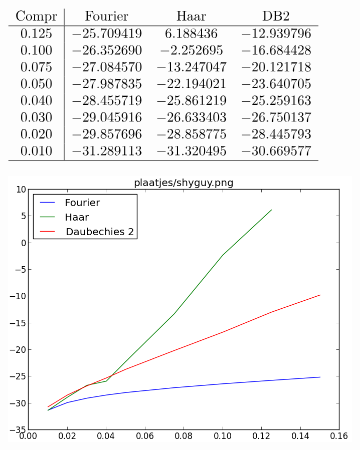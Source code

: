 \begin{figure}
  \centering
  \begin{subfigure}[t]{0.48\textwidth}
    \centering
    \vspace{10pt}
    \begingroup

    \renewcommand*{\arraystretch}{1.5}
    $\begin{array}{c | c c c c}
      \text{Compr} & \text{Fourier} & \text{Haar} & \text{DB2} \\ \hline
      0.125 & -25.709419 & 6.188436 & -12.939796 \\
      0.100 & -26.352690 & -2.252695 & -16.684428 \\
      0.075 & -27.084570 & -13.247047 & -20.121718 \\
      0.050 & -27.987835 & -22.194021 & -23.640705 \\
      0.040 & -28.455719 & -25.861219 & -25.259163 \\
      0.030 & -29.045916 & -26.633403 & -26.750137 \\
      0.020 & -29.857696 & -28.858775 & -28.445793 \\
      0.010 & -31.289113 & -31.320495 & -30.669577 \\ \hline
    \end{array}$
    \endgroup
  \end{subfigure}
  \begin{subfigure}[t]{0.48\textwidth}
    \centering
    \vspace{0pt}
    \includegraphics[height=\textwidth]{plaatjes/grafiek_shyguy_0_15-0_01.png}
  \end{subfigure}
\end{figure}
